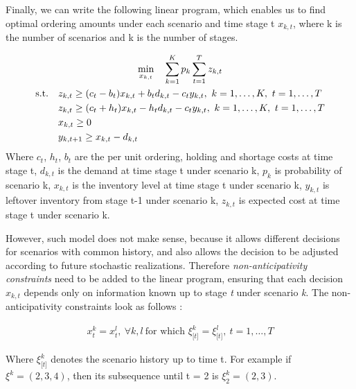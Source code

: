 \documentclass[11pt,a4paper]{article}
\begin{document}
Finally, we can write the following linear program, which enables us to find optimal ordering amounts under each scenario and time stage t $x_{k,t}$, where k is the number of scenarios and k is the number of stages.

\begin{equation}
\begin{gathered}
\min_{x_{k,t}} \quad 
\sum\limits_{k=1}^{K}{ p_k \sum\limits_{t=1}^{T}{ z_{k,t} }} \\
\begin{aligned}
\textup{s.t.}\quad  & z_{k,t}  \geq (c_t-b_t)x_{k,t} + b_t d_{k,t} -c_t y_{k,t} ,\ k = 1,\dots,K,\  t = 1,\dots,T\\
                  &z_{k,t}  \geq (c_t+h_t)x_{k,t} - h_t d_{k,t} -c_t y_{k,t} ,\ k = 1,\dots,K,\  t = 1,\dots,T  \\
         & x_{k,t} \geq 0 \\
         & y_{k,t+1}  \geq x_{k,t} - d_{k,t}
\end{aligned}
\end{gathered}
\end{equation}
Where $c_t$, $h_t$, $b_t$ are the per unit ordering, holding and shortage costs at time stage t, $d_{k,t}$ is the demand at time stage t under scenario k, $p_k$ is probability of scenario k, $x_{k,t}$ is the inventory level at time stage t under scenario k, $y_{k,t}$ is leftover inventory from stage t-1 under scenario k, $z_{k,t}$ is expected cost at time stage t under scenario k.


However, such model does not make sense, because it allows different decisions for scenarios with common history, and also allows the decision to be adjusted according to future stochastic realizations. Therefore \textit{non-anticipativity constraints} need to be added to the linear program, ensuring that each decision $x_{k,t}$ depends only on information known up to stage \textit{t} under scenario \textit{k}. The non-anticipativity constraints look as follows \cite{sp_book}:

\begin{eqnarray}
x_t^k = x_t^l,\ \forall{k,l}\ \text{for which } \xi_{\lbrack t \rbrack}^k=\xi_{\lbrack t \rbrack }^l,\ t = 1, \dots,T
\end{eqnarray}

Where  $\xi_{\lbrack t \rbrack}^k$ denotes the scenario history up to time t. For example if $\xi^k  = (2,3,4)$, then its subsequence until t = 2 is  $\xi_{2}^k = (2,3)$.
\end{document}
